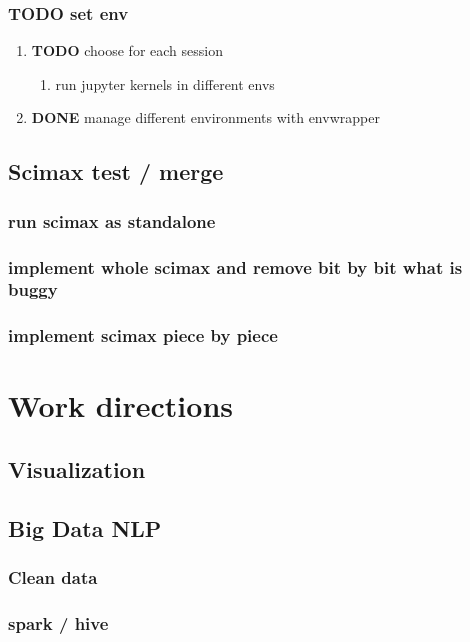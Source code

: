 \documentclass[11pt]{article}
\begin{document}
\subsubsection{{\bfseries\sffamily TODO} set env}
\label{sec:org8ca20db}
\begin{enumerate}
\item {\bfseries\sffamily TODO} choose for each session
\label{sec:org3e8f558}
\begin{enumerate}
\item run jupyter kernels in different envs
\label{sec:orgedebc5a}
\end{enumerate}
\item {\bfseries\sffamily DONE} manage different environments with envwrapper
\label{sec:orge04f253}
\end{enumerate}
\subsection{Scimax test / merge}
\label{sec:org8379992}
\subsubsection{run scimax as standalone}
\label{sec:org18e33f6}
\subsubsection{implement whole scimax and remove bit by bit what is buggy}
\label{sec:org99d8557}
\subsubsection{implement scimax piece by piece}
\label{sec:orga10c198}
\section{Work directions}
\label{sec:org689c87f}
\subsection{Visualization}
\label{sec:org30aa2af}
\subsection{Big Data NLP}
\label{sec:orgffdb288}
\subsubsection{Clean data}
\label{sec:org0257285}
\subsubsection{spark / hive}
\label{sec:orga94ba58}
\end{document}
